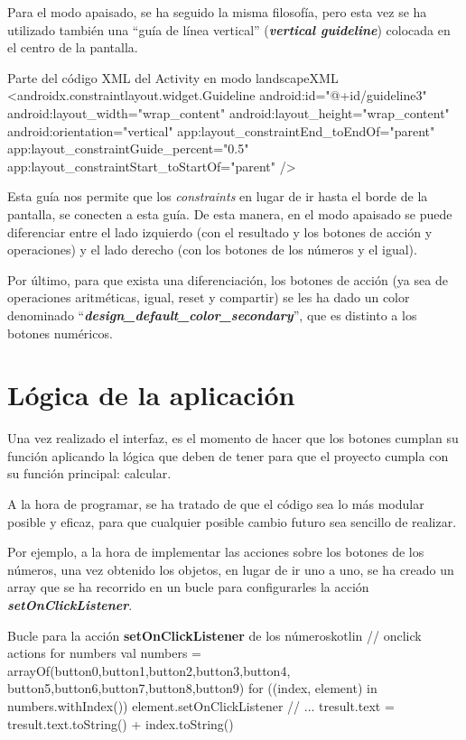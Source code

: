 \documentclass{\ClassPath/viu-tfm-template}
\begin{document}
Para el modo apaisado, se ha seguido la misma filosofía, pero esta vez se ha utilizado también una “guía de línea vertical” (\textbf{\textit{vertical guideline}}) colocada en el centro de la pantalla.


\begin{mycode}{Parte del código XML del Activity en modo landscape}{XML}{}
<androidx.constraintlayout.widget.Guideline
    android:id="@+id/guideline3"
    android:layout_width="wrap_content"
    android:layout_height="wrap_content"
    android:orientation="vertical"
    app:layout_constraintEnd_toEndOf="parent"
    app:layout_constraintGuide_percent="0.5"
    app:layout_constraintStart_toStartOf="parent" />
\end{mycode}

Esta guía nos permite que los \textit{constraints} en lugar de ir hasta el borde de la pantalla, se conecten a esta guía. De esta manera, en el modo apaisado se puede diferenciar entre el lado izquierdo (con el resultado y los botones de acción y operaciones) y el lado derecho (con los botones de los números y el igual).

Por último, para que exista una diferenciación, los botones de acción (ya sea de operaciones aritméticas, igual, reset y compartir) se les ha dado un color denominado “\textbf{\textit{design\_default\_color\_secondary}}”, que es distinto a los botones numéricos.


\section{Lógica de la aplicación}
Una vez realizado el interfaz, es el momento de hacer que los botones cumplan su función aplicando la lógica que deben de tener para que el proyecto cumpla con su función principal: calcular.

A la hora de programar, se ha tratado de que el código sea lo más modular posible y eficaz, para que cualquier posible cambio futuro sea sencillo de realizar.

Por ejemplo, a la hora de implementar las acciones sobre los botones de los números, una vez obtenido los objetos, en lugar de ir uno a uno, se ha creado un array que se ha recorrido en un bucle para configurarles la acción \textbf{\textit{setOnClickListener}}.

\begin{mycode}{Bucle para la acción \textbf{setOnClickListener} de los números}{kotlin}{}
// onclick actions for numbers
val numbers = arrayOf(button0,button1,button2,button3,button4,
button5,button6,button7,button8,button9)
for ((index, element) in numbers.withIndex()) {
    element.setOnClickListener {
        // ...
        tresult.text = tresult.text.toString() + index.toString()
    }
}
\end{mycode}
\end{document}
